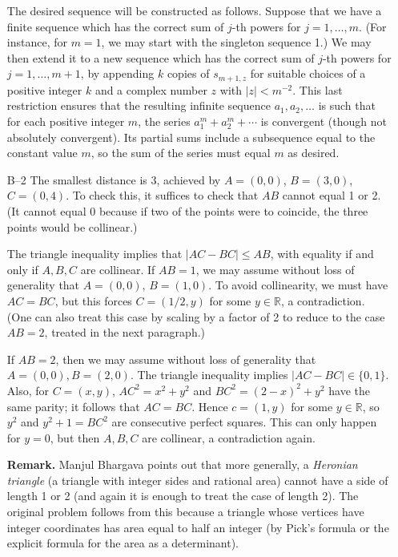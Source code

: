 \documentclass[amssymb,twocolumn,pra,10pt,aps]{revtex4-1}
\newcommand{\RR}{\mathbb{R}}
\begin{document}
\begin{itemize}
The desired sequence will be constructed as follows. Suppose that we have a finite sequence
which has the correct sum of $j$-th powers for $j=1,\dots,m$. (For instance, for $m=1$,
we may start with the singleton sequence 1.) We may then extend it to a new sequence which has
the correct sum of $j$-th powers for $j=1,\dots,m+1$, by appending $k$ copies of $s_{m+1,z}$
for suitable choices of a positive integer $k$ and a complex number $z$ with $|z| < m^{-2}$.
This last restriction ensures that the resulting infinite sequence $a_1,a_2,\dots$ is such that
for each positive integer $m$, the series $a_1^m + a_2^m + \cdots$ is convergent (though not absolutely
convergent). Its partial sums include a subsequence equal to the constant value $m$, so the sum of the series
must equal $m$ as desired.

\item[B--2]
The smallest distance is 3, achieved by $A = (0,0)$, $B = (3,0)$, $C = (0,4)$.
To check this, it suffices to check that $AB$ cannot equal 1 or 2. (It cannot equal 0
because if two of the points were to coincide, the three points would be collinear.)

The triangle inequality implies that $|AC - BC| \leq AB$, with equality if and only if $A,B,C$
are collinear. If $AB = 1$, we may assume without loss of generality that $A = (0,0)$, $B = (1,0)$.
To avoid collinearity, we must have $AC = BC$, but this forces $C = (1/2, y)$ for some $y \in \RR$,
a contradiction. (One can also treat this case by scaling by a factor of 2 to reduce to the case $AB=2$,
treated in the next paragraph.)

If $AB = 2$, then we may assume without loss of generality that $A = (0,0), B = (2,0)$.
The triangle inequality implies $|AC - BC| \in \{0,1\}$.
Also, for $C = (x,y)$, $AC^2 = x^2 + y^2$ and $BC^2 = (2-x)^2 + y^2$ have the same parity;
it follows that $AC = BC$. Hence $c = (1,y)$ for some $y \in \RR$, so $y^2$ and $y^2+1=BC^2$
are consecutive perfect squares. This can only happen for $y = 0$, but then $A,B,C$ are collinear,
a contradiction again.

\textbf{Remark.} Manjul Bhargava points out that more generally, a \emph{Heronian triangle}
(a triangle with integer sides and rational area) cannot have a side of length 1 or 2 (and again
it is enough to treat the case of length 2). The original
problem follows from this because a triangle whose vertices have integer coordinates has area
equal to half an integer (by Pick's formula or the explicit formula for the area as a determinant).


\end{itemize}
\end{document}
